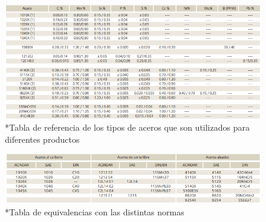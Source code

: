 \documentclass[12pt,a4paper]{article}
\begin{document}
\begin{figure}[H]    
    \centering         
    \includegraphics[width=1\textwidth]{Inagenes para latex/16.png}
    \caption*{*Tabla de referencia de los tipos de aceros que son utilizados para diferentes productos}
\end{figure}
\begin{figure}[H]    
    \centering         
    \includegraphics[width=1\textwidth]{Inagenes para latex/17.png}
    \caption*{*Tabla de equivalencias con las distintas normas}
\end{figure}
\end{document}
